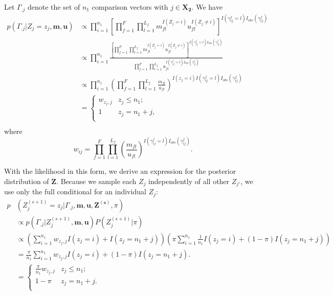 \documentclass[ba]{imsart}
\begin{document}
Let \(\Gamma_{.j}\) denote the set of \(n_1\) comparison vectors with \(j \in \bm{X_2}\). We have
\begin{align*}
	p(\Gamma_{.j}|Z_j = z_j, \bm{m}, \bm{u}) &\propto \prod_{i=1}^{n_1}\left[\prod_{f=1}^{F}\prod_{l=1}^{L_f} m_{fl}^{I(Z_j = i)}u_{fl}^{I(Z_j \neq i)}\right]^{I(\gamma_{ij}^f = l)I_{obs}(\gamma_{ij}^f)}\\
	&\propto \prod_{i=1}^{n_1}\frac{\left[\prod_{f=1}^{F}\prod_{l=1}^{L_f} m_{fl}^{I(Z_j = i)}u_{fl}^{I(Z_j \neq i)}\right]^{I(\gamma_{ij}^f = l)I_{obs}(\gamma_{ij}^f)}}{\prod_{f=1}^{F}\prod_{l=1}^{L_f} u_{fl}^{I(\gamma_{ij}^f = l)I_{obs}(\gamma_{ij}^f)}}\\
	&\propto \prod_{i=1}^{n_1}\left(\prod_{f=1}^{F}\prod_{l=1}^{L_f} \frac{m_{fl}}{u_{fl}}\right)^{I(z_j = i) I(\gamma_{ij}^f = l)I_{obs}(\gamma_{ij}^f)} \\
	&=
	\begin{cases} 
		w_{z_j, j}  & z_j \leq n_1; \\
		1 &  z_j  = n_1 + j, \\
	\end{cases}\\
\end{align*}
where
$$w_{ij} = \prod_{f=1}^{F}\prod_{l = 1}^{L_f} \left(\frac{m_{fl}}{u_{fl}}\right)^{I(\gamma_{ij}^f = l)I_{obs}(\gamma_{ij}^f)}.$$

With the likelihood in this form, we derive an expression for the posterior distribution of $\bm{Z}$. Because we sample each \(Z_j\) independently of all other \(Z_{j'}\), we use only the full conditional for an individual \(Z_j\):
\newpage
\begin{align*}
	p&\left(Z_j^{(s+1)} = z_j|\Gamma_{.j}, \bm{m}, \bm{u}, \bm{Z^{(s)}}, \pi\right) \\
	&\propto p(\Gamma_{.j}| Z_j^{(s+1)}, \bm{m}, \bm{u}) P(Z_j^{(s+1)}|\pi) \\
	&\propto \left(\sum_{i=1}^{n_1}w_{z_j, j}I(z_j = i) + I(z_j = n_1 + j) \right) \left (\pi\sum_{i=1}^{n_1}\frac{1}{n_1}I(z_j = i) + (1-\pi)I(z_j = n_1 + j) \right) \\	
	&= \frac{\pi}{n_1}\sum_{i=1}^{n_1}w_{z_j, j}I(z_j = i) + (1-\pi)I(z_j = n_1 + j). \\
	&= \begin{cases} 
		\frac{\pi}{n_1}w_{z_{j}, j}   & z_j \leq n_1; \\
		1-\pi &  z_j  = n_1 + j. \\
	\end{cases}
\end{align*}
\end{document}
